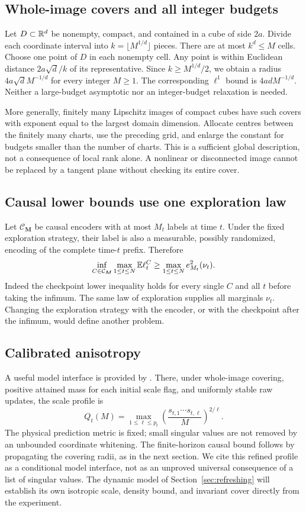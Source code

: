 \subsection{Whole-image covers and all integer budgets}
Let $D\subset\mathbb R^d$ be nonempty, compact, and contained in a cube of side
$2a$. Divide each coordinate interval into
$k=\lfloor M^{1/d}\rfloor$ pieces. There are at most $k^d\le M$ cells.
Choose one point of $D$ in each nonempty cell. Any point is within Euclidean
distance $2a\sqrt d/k$ of its representative. Since
$k\ge M^{1/d}/2$, we obtain a radius $4a\sqrt d M^{-1/d}$ for every
integer $M\ge1$. The corresponding $\ell^1$ bound is $4adM^{-1/d}$.
Neither a large-budget asymptotic nor an integer-budget relaxation is needed.

More generally, finitely many Lipschitz images of compact cubes have such
covers with exponent equal to the largest domain dimension. Allocate
centres between the finitely many charts, use the preceding grid, and enlarge
the constant for budgets smaller than the number of charts. This is a
sufficient global description, not a consequence of local rank alone.
A nonlinear or disconnected image cannot be replaced by a tangent plane
without checking its entire cover.

\subsection{Causal lower bounds use one exploration law}
Let $\mathcal C_{\boldsymbol M}$ be causal encoders with at most $M_t$ labels
at time $t$. Under the fixed exploration strategy, their label is also a
measurable, possibly randomized, encoding of the complete time-$t$ prefix.
Therefore
\begin{equation}\label{eq:causal-lower}
 \inf_{C\in\mathcal C_{\boldsymbol M}}
       \max_{1\le t\le N}\mathbb E\ell_t^C
 \ge \max_{1\le t\le N}e_{M_t}^2(\nu_t).
\end{equation}
Indeed the checkpoint lower inequality holds for every single $C$ and all
$t$ before taking the infimum. The same law of exploration supplies all
marginals $\nu_t$. Changing the exploration strategy with the encoder, or
with the checkpoint after the infimum, would define another problem.

\subsection{Calibrated anisotropy}
A useful model interface is provided by \cite{QiA1}. There, under whole-image
covering, positive attained mass for each initial scale flag, and uniformly
stable raw updates, the scale profile is
\[
 Q_t(M)=\max_{1\le\ell\le p_t}
   \left(\frac{s_{t,1}\cdots s_{t,\ell}}{M}\right)^{2/\ell}.
\]
The physical prediction metric is fixed; small singular values are not
removed by an unbounded coordinate whitening. The finite-horizon causal
bound follows by propagating the covering radii, as in the next section.
We cite this refined profile as a conditional model interface, not as an
unproved universal consequence of a list of singular values. The dynamic
model of Section~\ref{sec:refreshing} will establish its own isotropic
scale, density bound, and invariant cover directly from the experiment.
